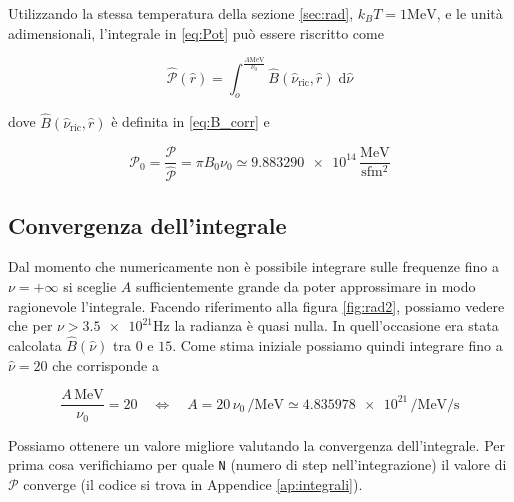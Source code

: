 \documentclass[a4paper, titlepage]{article}
\begin{document}
Utilizzando la stessa temperatura della sezione \ref{sec:rad}, $k_B T = 1 \unit{\mega\electronvolt}$, e le unità adimensionali, l'integrale in \ref{eq:Pot} può essere riscritto come

\begin{equation}
    \hat{\mathcal P}(\hat r) = \int_o^{\frac{A \unit{\mega\electronvolt}}{\nu_0}} \hat B (\hat \nu_\text{ric}, \hat r) \; \mathrm{d} \hat \nu
    \label{eq:Pot_ad}
\end{equation}

dove $\hat B (\hat \nu_\text{ric}, \hat r)$ è definita in \ref{eq:B_corr} e

\begin{equation}
    \mathcal P_0 = \frac{\mathcal P}{\hat {\mathcal P}} = \pi B_0 \nu_0 \simeq \num{9.883290e+14} \, \frac{\unit{\mega\electronvolt}}{\unit{\second\femto\meter\squared}}
\end{equation}

\subsection{Convergenza dell'integrale}
Dal momento che numericamente non è possibile integrare sulle frequenze fino a $\nu = + \infty$ si sceglie $A$ sufficientemente grande da poter approssimare in modo ragionevole l'integrale.
Facendo riferimento alla figura \ref{fig:rad2}, possiamo vedere che per $\nu > \num{3.5e21} \unit{\hertz}$ la radianza è quasi nulla.
In quell'occasione era stata calcolata $\hat B(\hat \nu)$ tra $0$ e $15$. Come stima iniziale possiamo quindi integrare fino a $\hat \nu = 20$ che corrisponde a

\begin{equation}
    \frac{A \, \unit{\mega\electronvolt}}{\nu_0} = 20
    \quad \iff \quad
    A = 20 \, \nu_0 \, \unit{\per\mega\electronvolt} \simeq \num{4.835978e21} \, \unit{\per\mega\electronvolt\per\second}
    \label{eq:A}
\end{equation}

Possiamo ottenere un valore migliore valutando la convergenza dell'integrale. Per prima cosa verifichiamo per quale \texttt{N} (numero di step nell'integrazione) il valore di $\mathcal{P}$ converge (il codice si trova in Appendice \ref{ap:integrali}).
\end{document}

